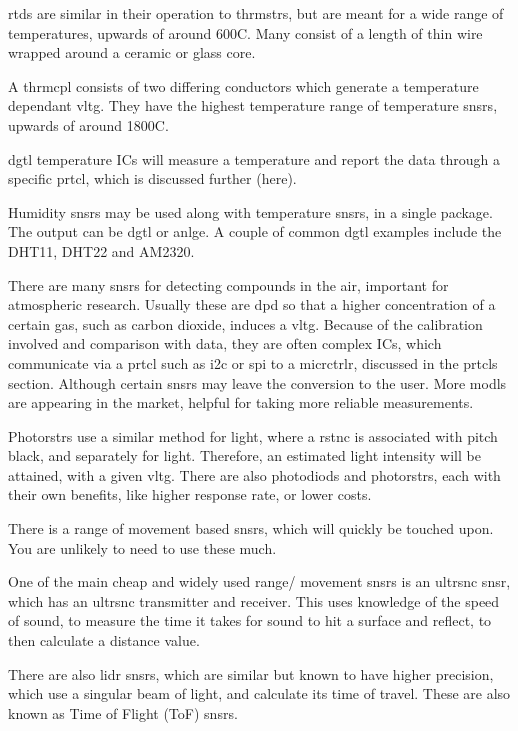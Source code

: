 \documentclass[a4paper,11pt]{report}
\begin{document}
\gls{rtd}s are similar in their operation to \gls{thrmstr}s, but are meant for a wide range of temperatures, upwards of around 600C. Many consist of a length of thin wire wrapped around a ceramic or glass \gls{core}.

A \gls{thrmcpl} consists of two differing conductors which generate a temperature dependant \gls{vltg}. They have the highest temperature range of temperature \gls{snsr}s, upwards of around 1800C.

\gls{dgtl} temperature ICs will measure a temperature and report the data through a specific \gls{prtcl}, which is discussed further (here).


Humidity \gls{snsr}s may be used along with temperature \gls{snsr}s, in a single package. The output can be \gls{dgtl} or \gls{anlge}. A couple of common \gls{dgtl} examples include the DHT11, DHT22 and AM2320.


There are many \gls{snsr}s for detecting compounds in the air, important for atmospheric research. Usually these are \gls{dpd} so that a higher concentration of a certain gas, such as carbon dioxide, induces a \gls{vltg}. Because of the calibration involved and comparison with data, they are often complex ICs, which communicate via a \gls{prtcl} such as \gls{i2c} or \gls{spi} to a \gls{micrctrlr}, discussed in the \gls{prtcl}s section. Although certain \gls{snsr}s may leave the conversion to the user. More \gls{modl}s are appearing in the market, helpful for taking more reliable measurements.


Photo\gls{rstr}s use a similar method for light, where a \gls{rstnc} is associated with pitch black, and separately for light. Therefore, an estimated light intensity will be attained, with a given \gls{vltg}. There are also photo\gls{diod}s and photo\gls{rstr}s, each with their own benefits, like higher response rate, or lower costs.


There is a range of movement based \gls{snsr}s, which will quickly be touched upon. You are unlikely to need to use these much.

One of the main cheap and widely used range/ movement \gls{snsr}s is an \gls{ultrsnc} \gls{snsr}, which has an \gls{ultrsnc} transmitter and receiver. This uses knowledge of the speed of sound, to measure the time it takes for sound to hit a surface and reflect, to then calculate a distance value.

There are also \gls{lidr} \gls{snsr}s, which are similar but known to have higher precision, which use a singular beam of light, and calculate its time of travel. These are also known as Time of Flight (ToF) \gls{snsr}s.
\end{document}
